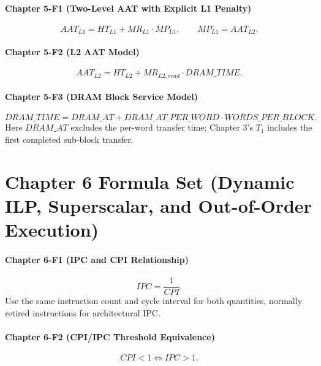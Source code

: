 \paragraph{Chapter 5-F1 (Two-Level AAT with Explicit L1 Penalty)}\label{par:auto-071}
\begin{equation}\label{eq:auto-083}
    AAT_{L1}=HT_{L1}+MR_{L1}\cdot MP_{L1},\qquad
    MP_{L1}=AAT_{L2}.
\end{equation}

\paragraph{Chapter 5-F2 (L2 AAT Model)}\label{par:auto-072}
\begin{equation}\label{eq:auto-084}
    AAT_{L2}=HT_{L2}+MR_{L2,read}\cdot DRAM\_TIME.
\end{equation}

\paragraph{Chapter 5-F3 (DRAM Block Service Model)}\label{par:auto-073}
\begin{equation}\label{eq:auto-085}
    DRAM\_TIME=DRAM\_AT+DRAM\_AT\_PER\_WORD\cdot WORDS\_PER\_BLOCK.
\end{equation}
Here $DRAM\_AT$ excludes the per-word transfer time; Chapter 3's $T_1$ includes the first completed sub-block transfer.


\section*{Chapter 6 Formula Set (Dynamic ILP, Superscalar, and Out-of-Order Execution)}\label{sec:ch6-formulas}

\paragraph{Chapter 6-F1 (IPC and CPI Relationship)}\label{par:ch6-formula-1}
\begin{equation}\label{eq:app-ch6-formula-ipc-cpi}
    IPC=\frac{1}{CPI}.
\end{equation}
Use the same instruction count and cycle interval for both quantities, normally retired instructions for architectural IPC.

\paragraph{Chapter 6-F2 (CPI/IPC Threshold Equivalence)}\label{par:ch6-formula-2}
\begin{equation}\label{eq:app-ch6-formula-threshold}
    CPI<1 \iff IPC>1.
\end{equation}

